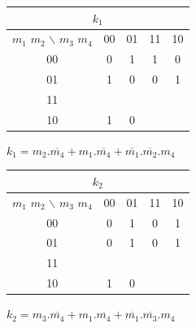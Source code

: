 \begin{minipage}{0.45\linewidth}
\begin{center}
\begin{tabular}{|c|c|c|c|c|}
\hline
\multicolumn{5}{|c|}{$k_1$} \\
\hline
$m_1$ $m_2$ $\backslash$ $m_3$ $m_4$ & 00 & 01 & 11 & 10 \\
\hline
00  & 0 & \cellcolor{bleuf} 1 & \cellcolor{bleuf} 1 & 0 \\
\hline
01  & \cellcolor{bleuf}1 & 0 & 0 &  \cellcolor{bleuf} 1 \\
\hline
11  & \cellcolor{bleuf} &  &  & \cellcolor{bleuf} \\
\hline
10  & \cellcolor{bleuf} 1 & 0 &  & \cellcolor{bleuf} \\
\hline
\end{tabular} 
\end{center}
\end{minipage}\hfill
\begin{minipage}{0.45\linewidth}
$k_1=m_2.\overline{m_4}+m_1.\overline{m_4}+\overline{m_1}.\overline{m_2}.m_4$
\end{minipage}

\begin{minipage}{0.45\linewidth}
\begin{center}
\begin{tabular}{|c|c|c|c|c|}
\hline
\multicolumn{5}{|c|}{$k_2$} \\
\hline
$m_1$ $m_2$ $\backslash$ $m_3$ $m_4$ & 00 & 01 & 11 & 10 \\
\hline
00  & 0 & \cellcolor{bleuf} 1 & 0 & \cellcolor{bleuf} 1  \\
\hline
01  & 0 & \cellcolor{bleuf} 1 & 0 &  \cellcolor{bleuf} 1 \\
\hline
11  & \cellcolor{bleuf} &  &  & \cellcolor{bleuf} \\
\hline
10  & \cellcolor{bleuf} 1 & 0 &  & \cellcolor{bleuf} \\
\hline
\end{tabular} 
\end{center}
\end{minipage}\hfill
\begin{minipage}{0.45\linewidth}
$k_2=m_3.\overline{m_4}+m_1.\overline{m_4}+\overline{m_1}.\overline{m_3}.m_4$
\end{minipage}

